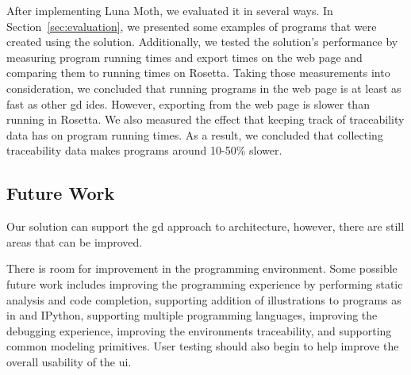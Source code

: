 After implementing Luna Moth, we evaluated it in several ways.
In Section~\ref{sec:evaluation}, we presented some examples of programs that were created using the solution.
Additionally, we tested the solution's performance by measuring program running times and export times on the web page and comparing them to running times on Rosetta.
Taking those measurements into consideration, we concluded that running programs in the web page is at least as fast as other \gls{gd} \glspl{ide}.
However, exporting from the web page is slower than running in Rosetta.
We also measured the effect that keeping track of traceability data has on program running times.
As a result, we concluded that collecting traceability data makes programs around 10-50\% slower.



\subsection{Future Work}
Our solution can support the \gls{gd} approach to architecture, however, there are still areas that can be improved.



There is room for improvement in the programming environment.
Some possible future work includes improving the programming experience by performing static analysis and code completion, supporting addition of illustrations to programs as in \cite{Leitao2014illustrated} and IPython, supporting multiple programming languages, improving the debugging experience, improving the environments traceability, and supporting common modeling primitives.
User testing should also begin to help improve the overall usability of the \gls{ui}.


